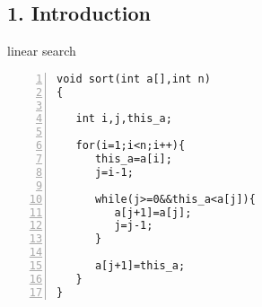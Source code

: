 \documentclass{beamer}
\begin{document}
\subsection*{1. Introduction}


\begin{frame}[fragile]{linear search}
\begin{lstlisting}[numbers=left]
void sort(int a[],int n)
{

   int i,j,this_a;

   for(i=1;i<n;i++){
      this_a=a[i];
      j=i-1;

      while(j>=0&&this_a<a[j]){
         a[j+1]=a[j];
         j=j-1;
      }

      a[j+1]=this_a;
   }
}
\end{lstlisting}
\end{frame}
\end{document}

